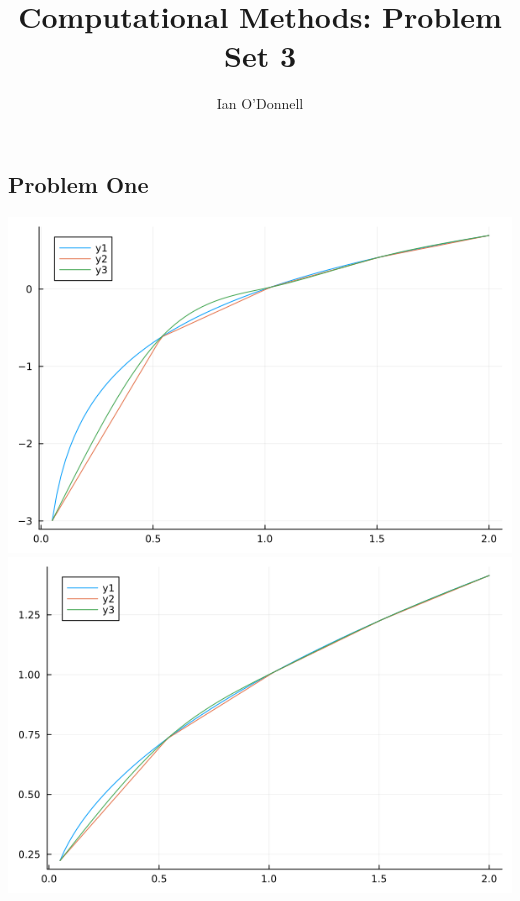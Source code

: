 \documentclass{article}
\title{Computational Methods: Problem Set 3}
\author{Ian O'Donnell}
\date{\vspace{-5ex}}
\begin{document}
\maketitle
\subsection*{Problem One}

\includegraphics[scale = 0.6]{p1.png}
\includegraphics[scale = 0.6]{p2.png}
\end{document}
